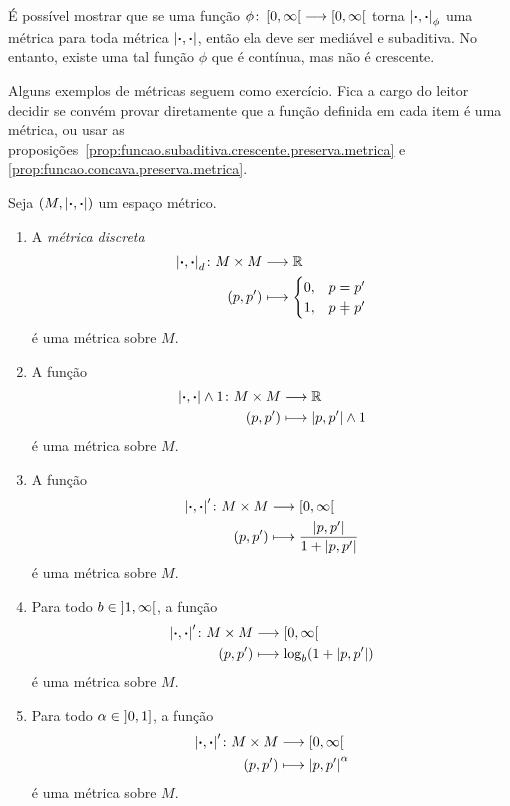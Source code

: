 É possível mostrar que se uma função $\phi\colon \allowbreak \left[0,\allowbreak \infty\right[ \longrightarrow \left[0,\allowbreak \infty\right[$ torna $\left\vert{\bm{\cdot}},{\bm{\cdot}}\right\vert_\phi$ uma métrica para toda métrica $\left\vert{\bm{\cdot}},{\bm{\cdot}}\right\vert$, então ela deve ser mediável e subaditiva. No entanto, existe uma tal função $\phi$ que é contínua, mas não é crescente.

Alguns exemplos de métricas seguem como exercício. Fica a cargo do leitor decidir se convém provar diretamente que a função definida em cada item é uma métrica, ou usar as proposições~\ref{prop:funcao.subaditiva.crescente.preserva.metrica} e \ref{prop:funcao.concava.preserva.metrica}.

\begin{exercise}
Seja $(M,\left\vert{\bm{\cdot}},{\bm{\cdot}}\right\vert)$ um espaço métrico.
	\begin{enumerate}
	\item A \emph{métrica discreta}
		\begin{align*}
		\func{\dist{\var}{\var}_d}{M \times M}{\R}{(p,p')}{
			\begin{cases}
			0,& p = p' \\
			1,& p \neq p'
			\end{cases}
		}
		\end{align*}
	é uma métrica sobre $M$.
	
	\item A função%
		\begin{align*}
		{\left\vert{\bm{\cdot}},{\bm{\cdot}}\right\vert \mathbin{\wedge}1}\colon {M \times M} &\longrightarrow {\mathbb{R}} \\{(p,p')} &\longmapsto \left\vert{p},{p'}\right\vert \mathbin{\wedge} 1
		\end{align*}
	é uma métrica sobre $M$.
	
	\item A função
		\begin{align*}
		{\left\vert{\bm{\cdot}},{\bm{\cdot}}\right\vert'}\colon {M \times M} &\longrightarrow {\left[0,\allowbreak \infty\right[} \\{(p,p')} &\longmapsto \frac{\left\vert{p},{p'}\right\vert}{1+\left\vert{p},{p'}\right\vert}
		\end{align*}
	é uma métrica sobre $M$.
	
	\item Para todo $b \in \left]1,\allowbreak \infty\right[$, a função
		\begin{align*}
		{\left\vert{\bm{\cdot}},{\bm{\cdot}}\right\vert'}\colon {M \times M} &\longrightarrow {\left[0,\allowbreak \infty\right[} \\{(p,p')} &\longmapsto \log_b(1+\left\vert{p},{p'}\right\vert)
		\end{align*}
	é uma métrica sobre $M$.
	
	\item Para todo $\alpha \in \left]0,\allowbreak 1\right]$, a função
		\begin{align*}
		{\left\vert{\bm{\cdot}},{\bm{\cdot}}\right\vert'}\colon {M \times M} &\longrightarrow {\left[0,\allowbreak \infty\right[} \\{(p,p')} &\longmapsto \left\vert{p},{p'}\right\vert^\alpha
		\end{align*}
	é uma métrica sobre $M$.	
	\end{enumerate}
\end{exercise}

